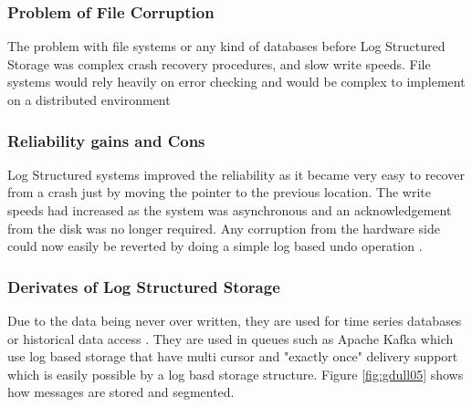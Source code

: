 \documentclass[12pt,a4paper]{article}
\begin{document}
\subsubsection{Problem of File Corruption}
The problem with file systems or any kind of databases before Log Structured Storage was complex crash recovery procedures, and slow write speeds. File systems would rely heavily on error checking and would be complex to implement on a distributed environment \citep{swinehart1979wfs}
	
\subsubsection{Reliability gains and Cons}
Log Structured systems improved the reliability as it became very easy to recover from a crash just by moving the pointer to the previous location. The write speeds had increased as the system was asynchronous and an acknowledgement from the disk was no longer required. Any corruption from the hardware side could now easily be reverted by doing a simple log based undo operation \citep{reuter1980fast}.

\subsubsection{Derivates of Log Structured Storage}
Due to the data being never over written, they are used for time series databases or historical data access \citep{muth2000lham}. They are used in queues such as Apache Kafka which use log based storage that have multi cursor and "exactly once" delivery support\citep{kreps2011kafka} which is easily possible by a log basd storage structure. Figure \ref{fig:gdull05} shows how messages are stored and segmented.  \\
\end{document}
